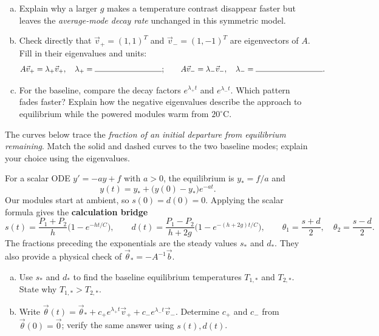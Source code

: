 \documentclass[10pt,letterpaper]{article}
\newcommand{\work}[1]{\vspace{#1}}
\begin{document}
\begin{enumerate}[a.,leftmargin=*]
\item Explain why a larger $g$ makes a temperature contrast disappear faster but leaves the \emph{average-mode decay rate} unchanged in this symmetric model.\work{0.43in}
\item Check directly that $\vec v_+=(1,1)^T$ and $\vec v_-=(1,-1)^T$ are eigenvectors of $A$. Fill in their eigenvalues and units:
\[
A\vec v_+=\lambda_+\vec v_+,\quad\lambda_+=\rule{1.2in}{0.4pt};\qquad
A\vec v_-=\lambda_-\vec v_-,\quad\lambda_-=\rule{1.2in}{0.4pt}.
\]
\item For the baseline, compare the decay factors $e^{\lambda_+t}$ and $e^{\lambda_-t}$. Which pattern fades faster? Explain how the negative eigenvalues describe the approach to equilibrium while the powered modules warm from $20^\circ$C.\work{0.55in}
\end{enumerate}
\newpage
The curves below trace the \emph{fraction of an initial departure from equilibrium remaining}. Match the solid and dashed curves to the two baseline modes; explain your choice using the eigenvalues.
\begin{center}
\end{center}

For a scalar ODE $y'=-ay+f$ with $a>0$, the equilibrium is $y_*=f/a$ and
\[
y(t)=y_*+\bigl(y(0)-y_*\bigr)e^{-at}.
\]
Our modules start at ambient, so $s(0)=d(0)=0$. Applying the scalar formula gives the \textbf{calculation bridge}
\[
s(t)=\frac{P_1+P_2}{h}\bigl(1-e^{-ht/C}\bigr),\qquad
d(t)=\frac{P_1-P_2}{h+2g}\bigl(1-e^{-(h+2g)t/C}\bigr),
\qquad
\theta_1=\frac{s+d}{2},\quad\theta_2=\frac{s-d}{2}.
\]
The fractions preceding the exponentials are the steady values $s_*$ and $d_*$. They also provide a physical check of $\vec\theta_*=-A^{-1}\vec b$.

\begin{enumerate}[d.,leftmargin=*]
\item Use $s_*$ and $d_*$ to find the baseline equilibrium temperatures $T_{1,*}$ and $T_{2,*}$. State why $T_{1,*}>T_{2,*}$.\work{0.47in}
\item Write $\vec\theta(t)=\vec\theta_*+c_+e^{\lambda_+t}\vec v_++c_-e^{\lambda_-t}\vec v_-$. Determine $c_+$ and $c_-$ from $\vec\theta(0)=\vec0$; verify the same answer using $s(t),d(t)$.\work{0.55in}
\end{enumerate}
\end{document}
